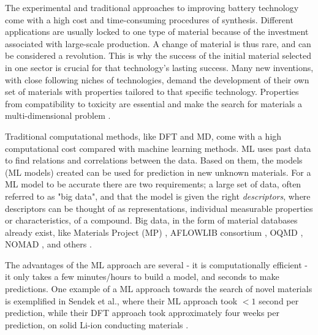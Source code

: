 


The experimental and traditional approaches to improving battery technology come with a high cost and time-consuming procedures of synthesis. Different applications are usually locked to one type of material because of the investment associated with large-scale production. A change of material is thus rare, and can be considered a revolution. This is why the success of the initial material selected in one sector is crucial for that technology's lasting success. Many new inventions, with close following niches of technologies, demand the development of their own set of materials with properties tailored to that specific technology. Properties from compatibility to toxicity are essential and make the search for materials a multi-dimensional problem \cite{curtarolo2013high}. 

Traditional computational methods, like DFT and MD, come with a high computational cost compared with machine learning methods. ML uses past data to find relations and correlations between the data. Based on them, the models (ML models) created can be used for prediction in new unknown materials. For a ML model to be accurate there are two requirements; a large set of data, often referred to as "big data", and that the model is given the right \textit{descriptors}, where descriptors can be thought of as representations, individual measurable properties or characteristics, of a compound. Big data, in the form of material databases already exist, like Materials Project (\ac{MP}) \cite{Jain2013}, AFLOWLIB consortium \cite{curtarolo2012aflowlib}, OQMD \cite{saal2013materials}, NOMAD \cite{draxl2018nomad}, and others \cite{schleder2019dft}.

The advantages of the ML approach are several - it is computationally efficient - it only takes a few minutes/hours to build a model, and seconds to make predictions. One example of a ML approach towards  the search of novel materials is exemplified in Sendek et al., where their ML approach took $<1$ second per prediction, while their DFT approach took approximately four weeks per prediction, on solid Li-ion conducting materials \cite{sendek2018machine}. 

